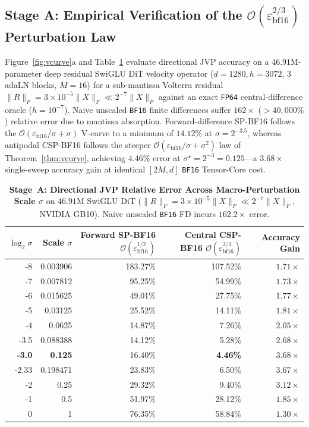 \documentclass[11pt,a4paper]{article}
\theoremstyle{definition}
\theoremstyle{remark}
\newcommand{\bfsixteen}{\texttt{BF16}}
\newcommand{\fpsixtyfour}{\texttt{FP64}}
\newcommand{\epsbf}{\varepsilon_{\mathrm{bf16}}}
\begin{document}
\subsection{Stage A: Empirical Verification of the $\mathcal{O}(\epsbf^{2/3})$ Perturbation Law}
Figure~\ref{fig:vcurve}a and Table~\ref{tab:stage_a} evaluate directional JVP accuracy on a $46.91\text{M}$-parameter deep residual SwiGLU DiT velocity operator ($d=1280, h=3072$, $3$ adaLN blocks, $M=16$) for a sub-mantissa Volterra residual $\|R\|_F = 3 \times 10^{-5}\|X\|_F \ll 2^{-7}\|X\|_F$ against an exact \fpsixtyfour{} central-difference oracle ($h = 10^{-7}$). Naive unscaled \bfsixteen{} finite differences suffer $162\times$ ($>40{,}000\%$) relative error due to mantissa absorption. Forward-difference \textsc{SP-BF16} follows the $\mathcal{O}(\epsbf/\sigma + \sigma)$ V-curve to a minimum of $14.12\%$ at $\sigma = 2^{-3.5}$, whereas antipodal \textsc{CSP-BF16} follows the steeper $\mathcal{O}(\epsbf/\sigma + \sigma^2)$ law of Theorem~\ref{thm:vcurve}, achieving \textbf{$4.46\%$} error at $\sigma^\star = 2^{-3} = 0.125$---a \textbf{$3.68\times$} single-sweep accuracy gain at identical $[2M, d]$ \bfsixteen{} Tensor-Core cost.

\begin{table}[t]
\centering
\small
\caption{\textbf{Stage~A: Directional JVP Relative Error Across Macro-Perturbation Scale $\sigma$} on $46.91\text{M}$ SwiGLU DiT ($\|R\|_F = 3\times 10^{-5}\|X\|_F \ll 2^{-7}\|X\|_F$, NVIDIA GB10). Naive unscaled \bfsixteen{} FD incurs $162.2\times$ error.}
\label{tab:stage_a}
\begin{tabular}{rrrrr}
\toprule
$\log_2 \sigma$ & Scale $\sigma$ & Forward \textsc{SP-BF16} $\mathcal{O}(\epsbf^{1/2})$ & Central \textsc{CSP-BF16} $\mathcal{O}(\epsbf^{2/3})$ & Accuracy Gain \\
\midrule
-8 & 0.003906 & 183.27\% & 107.52\% & $1.71\times$ \\
-7 & 0.007812 & 95.25\% & 54.99\% & $1.73\times$ \\
-6 & 0.015625 & 49.01\% & 27.75\% & $1.77\times$ \\
-5 & 0.03125 & 25.52\% & 14.11\% & $1.81\times$ \\
-4 & 0.0625 & 14.87\% & 7.26\% & $2.05\times$ \\
-3.5 & 0.088388 & 14.12\% & 5.28\% & $2.68\times$ \\
\textbf{-3.0} & \textbf{0.125} & 16.40\% & \textbf{4.46\%} & \textbf{$3.68\times$} \\
-2.33 & 0.198471 & 23.83\% & 6.50\% & $3.67\times$ \\
-2 & 0.25 & 29.32\% & 9.40\% & $3.12\times$ \\
-1 & 0.5 & 51.97\% & 28.12\% & $1.85\times$ \\
0 & 1 & 76.35\% & 58.84\% & $1.30\times$ \\
\bottomrule
\end{tabular}
\end{table}
\end{document}
